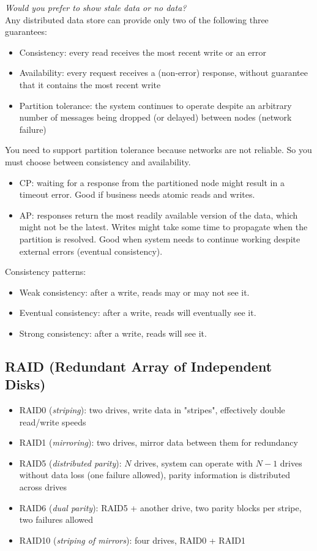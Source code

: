 \documentclass[12pt, titlepage]{article}
\begin{document}
\textit{Would you prefer to show stale data or no data?} \\

Any distributed data store can provide only two of the following three guarantees:
\begin{itemize}
  \item Consistency: every read receives the most recent write or an error
  \item Availability: every request receives a (non-error) response, without guarantee that it contains the most recent write
  \item Partition tolerance: the system continues to operate despite an arbitrary number of messages being dropped (or delayed) between nodes (network failure)
\end{itemize}

You need to support partition tolerance because networks are not reliable. So you must choose between consistency and availability.

\begin{itemize}
  \item CP: waiting for a response from the partitioned node might result in a timeout error. Good if business needs atomic reads and writes.
  \item AP: responses return the most readily available version of the data, which might not be the latest. Writes might take some time to propagate when the partition is resolved. Good when system needs to continue working despite external errors (eventual consistency).
\end{itemize}

Consistency patterns:
\begin{itemize}
  \item Weak consistency: after a write, reads may or may not see it.
  \item Eventual consistency: after a write, reads will eventually see it.
  \item Strong consistency: after a write, reads will see it.
\end{itemize}

\subsection{RAID (Redundant Array of Independent Disks)}

\begin{itemize}
  \item RAID0 (\textit{striping}): two drives, write data in "stripes", effectively double read/write speeds
  \item RAID1 (\textit{mirroring}): two drives, mirror data between them for redundancy
  \item RAID5 (\textit{distributed parity}): $N$ drives, system can operate with $N - 1$ drives without data loss (one failure allowed), parity information is distributed across drives
  \item RAID6 (\textit{dual parity}): RAID5 + another drive, two parity blocks per stripe, two failures allowed
  \item RAID10 (\textit{striping of mirrors}): four drives, RAID0 + RAID1
\end{itemize}
\end{document}
